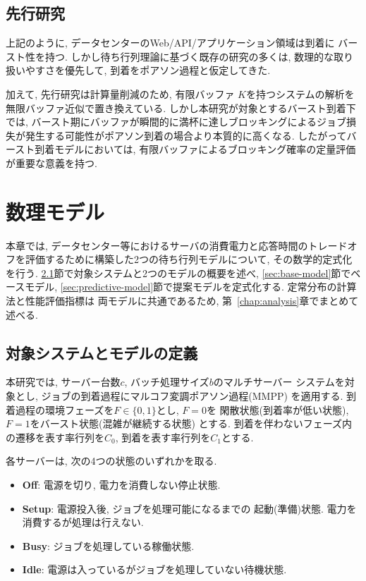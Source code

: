 \documentclass[a4paper, 11pt, dvipdfmx]{jsreport}
\begin{document}
\section{先行研究}
\label{sec:limitations}

上記のように, データセンターのWeb/API/アプリケーション領域は到着に
バースト性を持つ. しかし待ち行列理論に基づく既存の研究の多くは, 数理的な取り扱いやすさを優先して, 到着をポアソン過程と仮定してきた. 

加えて, 先行研究\cite{LeAnh2025}は計算量削減のため, 有限バッファ
$K$を持つシステムの解析を無限バッファ近似で置き換えている. しかし本研究が対象とするバースト到着下では, バースト期にバッファが瞬間的に満杯に達しブロッキングによるジョブ損失が発生する可能性がポアソン到着の場合より本質的に高くなる. 
したがってバースト到着モデルにおいては, 有限バッファによるブロッキング確率の定量評価が重要な意義を持つ. 

\chapter{数理モデル}
\label{chap:mathematical_model}

本章では, データセンター等におけるサーバの消費電力と応答時間のトレードオフを評価するために構築した2つの待ち行列モデルについて, その数学的定式化を行う. 
\ref{sec:system-definition}節で対象システムと2つのモデルの概要を述べ, 
\ref{sec:base-model}節でベースモデル, \ref{sec:predictive-model}節で提案モデルを定式化する. 定常分布の計算法と性能評価指標は
両モデルに共通であるため, 第~\ref{chap:analysis}章でまとめて述べる. 

\section{対象システムとモデルの定義}
\label{sec:system-definition}
本研究では, サーバー台数$c$, バッチ処理サイズ$b$のマルチサーバー
システムを対象とし, ジョブの到着過程にマルコフ変調ポアソン過程(MMPP)
を適用する. 到着過程の環境フェーズを$F\in\{0, 1\}$とし, $F=0$を
閑散状態(到着率が低い状態), $F=1$をバースト状態(混雑が継続する状態)
とする. 到着を伴わないフェーズ内の遷移を表す率行列を$C_0$, 
到着を表す率行列を$C_1$とする. 

各サーバーは, 次の4つの状態のいずれかを取る. 
\begin{itemize}
    \item \textbf{Off}: 電源を切り, 電力を消費しない停止状態. 
    \item \textbf{Setup}: 電源投入後, ジョブを処理可能になるまでの
        起動(準備)状態. 電力を消費するが処理は行えない. 
    \item \textbf{Busy}: ジョブを処理している稼働状態. 
    \item \textbf{Idle}: 電源は入っているがジョブを処理していない待機状態. 
\end{itemize}
\end{document}
